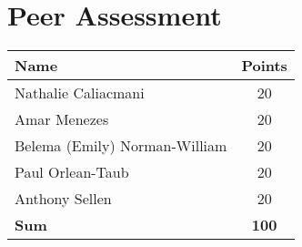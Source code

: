 \documentclass[titlepage]{article}
\begin{document}
\section{Peer Assessment}
	\begin{center}
	\begin{tabular}{| l | c |}
		\hline
		\textbf{Name}					&	\textbf{Points} \\ \hline
		Nathalie Caliacmani				&	20				\\ \hline
		Amar Menezes					&	20				\\ \hline
		Belema (Emily) Norman-William	&	20				\\ \hline
		Paul Orlean-Taub				&	20				\\ \hline
		Anthony Sellen					&	20				\\ \hline
		\textbf{Sum}					&	\textbf{100}	\\
		\hline
	\end{tabular}
	\end{center}
		



\end{document}
